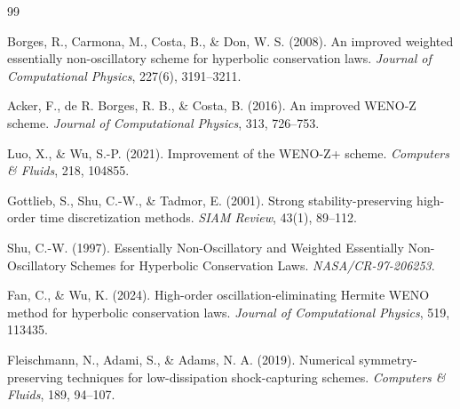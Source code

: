 \documentclass{article}
\numberwithin{equation}{section}
\begin{document}
\clearpage
\begin{thebibliography}{99}

Borges, R., Carmona, M., Costa, B., \& Don, W. S. (2008).
An improved weighted essentially non-oscillatory scheme for hyperbolic conservation laws.
\textit{Journal of Computational Physics}, 227(6), 3191--3211.

Acker, F., de R. Borges, R. B., \& Costa, B. (2016).
An improved WENO-Z scheme.
\textit{Journal of Computational Physics}, 313, 726--753.

Luo, X., \& Wu, S.-P. (2021).
Improvement of the WENO-Z+ scheme.
\textit{Computers \& Fluids}, 218, 104855.

Gottlieb, S., Shu, C.-W., \& Tadmor, E. (2001).
Strong stability-preserving high-order time discretization methods.
\textit{SIAM Review}, 43(1), 89--112.

Shu, C.-W. (1997).
Essentially Non-Oscillatory and Weighted Essentially Non-Oscillatory Schemes for Hyperbolic Conservation Laws.
\textit{NASA/CR-97-206253}.

Fan, C., \& Wu, K. (2024).
High-order oscillation-eliminating Hermite WENO method for hyperbolic conservation laws.
\textit{Journal of Computational Physics}, 519, 113435.

Fleischmann, N., Adami, S., \& Adams, N. A. (2019).
Numerical symmetry-preserving techniques for low-dissipation shock-capturing schemes.
\textit{Computers \& Fluids}, 189, 94--107.

\end{thebibliography}
\end{document}
